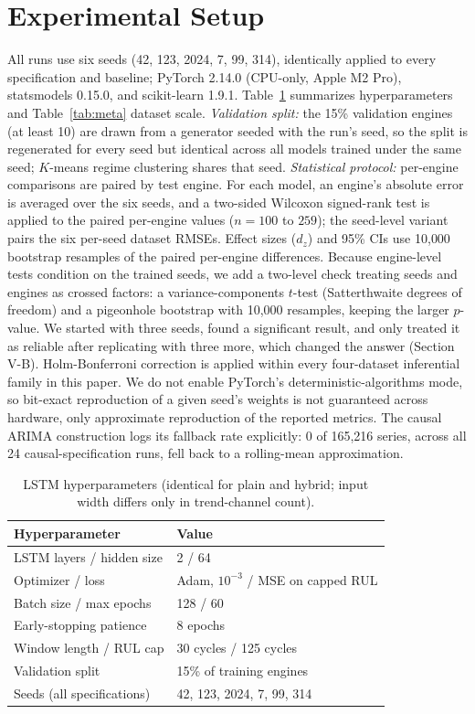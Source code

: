 \documentclass[conference]{IEEEtran}
\begin{document}
\section{Experimental Setup}
All runs use six seeds (42, 123, 2024, 7, 99, 314), identically applied to every specification and baseline; PyTorch 2.14.0 (CPU-only, Apple M2 Pro), statsmodels 0.15.0, and scikit-learn 1.9.1. Table~\ref{tab:hyperparams} summarizes hyperparameters and Table~\ref{tab:meta} dataset scale. \emph{Validation split:} the 15\% validation engines (at least 10) are drawn from a generator seeded with the run's seed, so the split is regenerated for every seed but identical across all models trained under the same seed; $K$-means regime clustering shares that seed. \emph{Statistical protocol:} per-engine comparisons are paired by test engine. For each model, an engine's absolute error is averaged over the six seeds, and a two-sided Wilcoxon signed-rank test is applied to the paired per-engine values ($n=100$ to $259$); the seed-level variant pairs the six per-seed dataset RMSEs. Effect sizes ($d_z$) and 95\% CIs use 10{,}000 bootstrap resamples of the paired per-engine differences. Because engine-level tests condition on the trained seeds, we add a two-level check treating seeds and engines as crossed factors: a variance-components $t$-test (Satterthwaite degrees of freedom) and a pigeonhole bootstrap \cite{owen2007} with 10{,}000 resamples, keeping the larger $p$-value. We started with three seeds, found a significant result, and only treated it as reliable after replicating with three more, which changed the answer (Section V-B). Holm-Bonferroni correction is applied within every four-dataset inferential family in this paper. We do not enable PyTorch's deterministic-algorithms mode, so bit-exact reproduction of a given seed's weights is not guaranteed across hardware, only approximate reproduction of the reported metrics. The causal ARIMA construction logs its fallback rate explicitly: 0 of 165{,}216 series, across all 24 causal-specification runs, fell back to a rolling-mean approximation.

\begin{table}[t]
\centering
\caption{LSTM hyperparameters (identical for plain and hybrid; input width differs only in trend-channel count).}
\label{tab:hyperparams}
\footnotesize
\begin{tabular}{ll}
\toprule
Hyperparameter & Value \\
\midrule
LSTM layers / hidden size & 2 / 64 \\
Optimizer / loss & Adam, $10^{-3}$ / MSE on capped RUL \\
Batch size / max epochs & 128 / 60 \\
Early-stopping patience & 8 epochs \\
Window length / RUL cap & 30 cycles / 125 cycles \\
Validation split & 15\% of training engines \\
Seeds (all specifications) & 42, 123, 2024, 7, 99, 314 \\
\bottomrule
\end{tabular}
\end{table}
\end{document}
